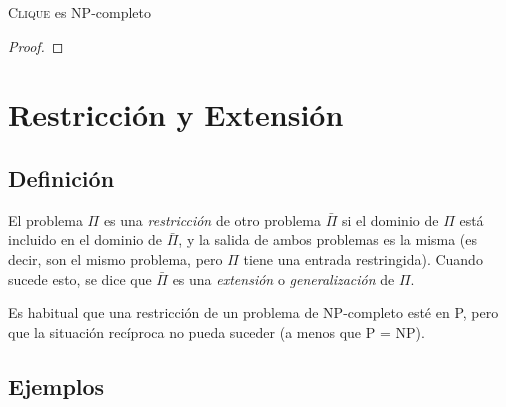 \begin{theorem*}
    \textsc{Clique} es NP-completo
\end{theorem*}
\begin{proof}
\end{proof}


\section{Restricción y Extensión}

\subsection{Definición}

El problema $\Pi$ es una \textit{restricción} de otro problema $\bar{\Pi}$ si el dominio de $\Pi$ está incluido en el dominio de $\bar{\Pi}$, y la salida de ambos problemas es la misma (es decir, son el mismo problema, pero $\Pi$ tiene una entrada restringida). Cuando sucede esto, se dice que $\bar{\Pi}$ es una \textit{extensión} o \textit{generalización} de $\Pi$.

Es habitual que una restricción de un problema de NP-completo esté en P, pero que la situación recíproca no pueda suceder (a menos que P = NP).

\subsection{Ejemplos}

